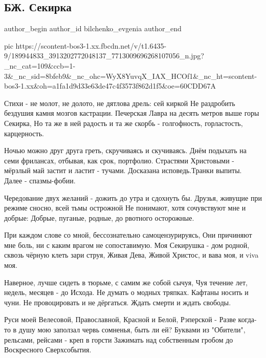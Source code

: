  
 
 
 
 
 
\subsection{БЖ. Секирка}
\label{sec:22_05_2021.fb.bilchenko_evgenia.1.sekirka}
\ifcmt
 author_begin
   author_id bilchenko_evgenia
 author_end
\fi

\ifcmt
  pic https://scontent-bos3-1.xx.fbcdn.net/v/t1.6435-9/189944833_3913202772048137_7713009696268107056_n.jpg?_nc_cat=109&ccb=1-3&_nc_sid=8bfeb9&_nc_ohc=WyX8YuvqX_IAX_HCOf1&_nc_ht=scontent-bos3-1.xx&oh=a1fa1d9d33e63de47c4f3573f862d1f5&oe=60CDD67A
\fi

Стихи - не молот, не долото, не дятлова дрель: сей киркой
Не раздробить бездушия камня мозгов кастрации.
Печерская Лавра на десять метров выше горы Секирка,
Но та же в ней радость и та же скорбь - голгофность, горластость, карцерность.

Ночью можно друг друга греть, скручиваясь и скучиваясь.
Днём подыхать на семи фрилансах, отбывая, как срок, портфолио.
Страстями Христовыми - мёрзлый май застит и ластит - тучами.
Досказана исповедь.Транки выпиты. Далее - спазмы-фобии.

Чередование двух желаний - дожить до утра и сдохнуть бы.
Друзья, живущие при режиме сносно, всей тьмы острожной
Не понимают, хотя сочувствуют мне и добрые:
Добрые, пуганые, родные, до рвотного осторожные.

При каждом слове со мной, бессознательно самоцензурируясь,
Они причиняют мне боль, ни с каким врагом не сопоставимую.
Моя Секирушка - дом родной, сквозь чёрную клеть зари струя,
Живая Дева, Живой Христос, и вава моя, и viva моя.

Наверное, лучше сидеть в тюрьме, с самим же собой сычуя,
Чуя течение лет, недель, месяцев - до Исхода.
Не думать о модных тряпках. Кафтаны носить и чуни.
Не провоцировать и не дёргаться. Ждать смерти и ждать свободы.

Руси моей Велесовой, Православной, Красной и Белой, Рэперской -
Разве когда-то в душу мою заползал червь сомненья, быть ли ей?
Буквами из "Обители", рельсами, рейсами - креп в горсти
Зажимать над собственным гробом до Воскресного Сверхсобытия.

